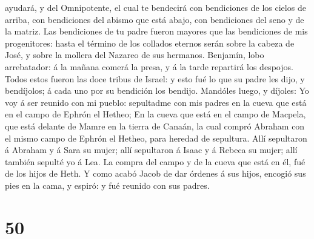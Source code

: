 ayudará, y del Omnipotente, el cual te bendecirá con bendiciones de los
cielos de arriba, con bendiciones del abismo que está abajo, con
bendiciones del seno y de la matriz.  Las bendiciones de tu
padre fueron mayores que las bendiciones de mis progenitores: hasta el
término de los collados eternos serán sobre la cabeza de José, y sobre
la mollera del Nazareo de sus hermanos.  Benjamín, lobo
arrebatador: á la mañana comerá la presa, y á la tarde repartirá los
despojos.  Todos estos fueron las doce tribus de Israel: y
esto fué lo que su padre les dijo, y bendíjolos; á cada uno por su
bendición los bendijo.  Mandóles luego, y díjoles: Yo voy á
ser reunido con mi pueblo: sepultadme con mis padres en la cueva que
está en el campo de Ephrón el Hetheo;  En la cueva que está
en el campo de Macpela, que está delante de Mamre en la tierra de
Canaán, la cual compró Abraham con el mismo campo de Ephrón el Hetheo,
para heredad de sepultura.  Allí sepultaron á Abraham y á
Sara su mujer; allí sepultaron á Isaac y á Rebeca su mujer; allí también
sepulté yo á Lea.  La compra del campo y de la cueva que
está en él, fué de los hijos de Heth.  Y como acabó Jacob
de dar órdenes á sus hijos, encogió sus pies en la cama, y espiró: y fué
reunido con sus padres.

\hypertarget{section-49}{%
\section{50}\label{section-49}}

